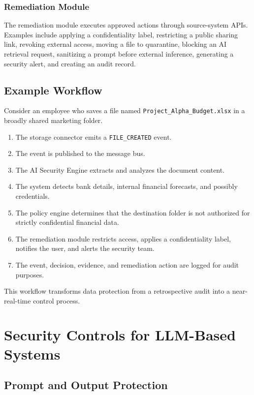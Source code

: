 \documentclass[conference]{IEEEtran}
\begin{document}
\subsubsection{Remediation Module}

The remediation module executes approved actions through source-system APIs. Examples include applying a confidentiality label, restricting a public sharing link, revoking external access, moving a file to quarantine, blocking an AI retrieval request, sanitizing a prompt before external inference, generating a security alert, and creating an audit record.

\subsection{Example Workflow}

Consider an employee who saves a file named \texttt{Project\_Alpha\_Budget.xlsx} in a broadly shared marketing folder.

\begin{enumerate}
  \item The storage connector emits a \texttt{FILE\_CREATED} event.
  \item The event is published to the message bus.
  \item The AI Security Engine extracts and analyzes the document content.
  \item The system detects bank details, internal financial forecasts, and possibly credentials.
  \item The policy engine determines that the destination folder is not authorized for strictly confidential financial data.
  \item The remediation module restricts access, applies a confidentiality label, notifies the user, and alerts the security team.
  \item The event, decision, evidence, and remediation action are logged for audit purposes.
\end{enumerate}

This workflow transforms data protection from a retrospective audit into a near-real-time control process.

\section{Security Controls for LLM-Based Systems}

\subsection{Prompt and Output Protection}
\end{document}
